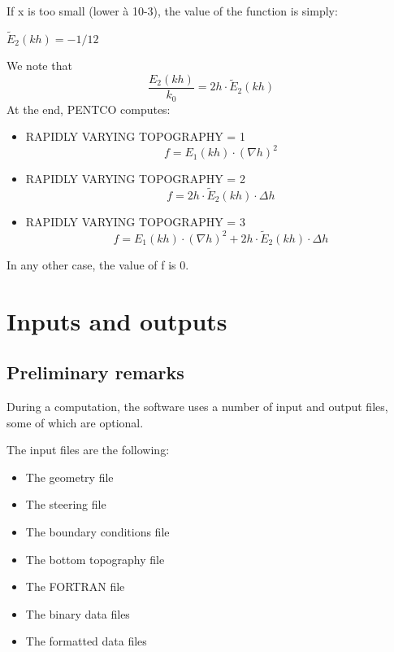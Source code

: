 If x is too small (lower \`{a} 10-3), the value of the function is simply:

$\tilde{E}_{2} \left(kh\right)=-1/12$

We note that
\[\frac{E_{2} \left(kh\right)}{k_{0} } =2h\cdot \tilde{E}_{2} \left(kh\right)\]
At the end, PENTCO computes:

\begin{itemize}
\item  RAPIDLY VARYING TOPOGRAPHY = 1
\[f=E_{1} (kh)\cdot \left(\nabla h\right)^{2} \]

\item  RAPIDLY VARYING TOPOGRAPHY = 2
\[f=2h\cdot \tilde{E}_{2} (kh)\cdot \Delta h\]

\item  RAPIDLY VARYING TOPOGRAPHY = 3
\[f=E_{1} (kh)\cdot \left(\nabla h\right)^{2} +2h\cdot \tilde{E}_{2} (kh)\cdot \Delta h\]
\end{itemize}


In any other case, the value of f is 0.

\eject


\chapter{Inputs and outputs}


\section{Preliminary remarks}

During a computation, the \artemis{} software uses a number of input and output files, some of which are optional.

The input files are the following:

\begin{itemize}
\item  The geometry file

\item  The steering file

\item  The boundary conditions file

\item  The bottom topography file

\item  The FORTRAN file

\item  The binary data files

\item  The formatted data files
\end{itemize}

